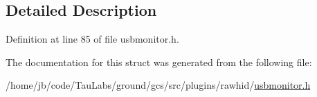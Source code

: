 \subsection{\-Detailed \-Description}


\-Definition at line 85 of file usbmonitor.\-h.



\-The documentation for this struct was generated from the following file\-:\begin{DoxyCompactItemize}
\item 
/home/jb/code/\-Tau\-Labs/ground/gcs/src/plugins/rawhid/\hyperlink{usbmonitor_8h}{usbmonitor.\-h}\end{DoxyCompactItemize}
